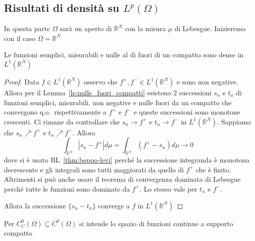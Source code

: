 \subsection{Risultati di densità su \(L^{p}{(\Omega)}\) }
In questa parte \(\Omega\) sarà un aperto di \(\mathbb{R}^{N}\) con la misura
\(\mu\) di Lebesgue. Inizieremo con il caso \(\Omega = \mathbb{R}^{N}\) 
\begin{proposition}\label{prop:risultato_1}
    Le funzioni semplici, misurabili e nulle al di fuori di un compatto sono
    dense in \(L^1(\mathbb{R}^{N})\) 
\end{proposition}
\begin{proof}
    Data \(f \in L^1(\mathbb{R}^{N})\) osservo che \(f^{+}, f^{-} \in
    L^1(\mathbb{R}^{N})\) e sono non negative. Allora per il
    Lemma~\ref{le:nulle_fuori_compatti} esistono 2 successioni
    \(s_{n}\) e \(t_{n}\) di funzioni semplici, misurabili, non negative e nulle fuori da un
    compatto che convergono q.o.~rispettivamente a \(f^{+}\) e \(f^{-}\) e
    queste successioni sono monotone crescenti. Ci rimane da controllare che
    \(s_{n} \to f^{+}\) e \(t_{n} \to f^{-}\) in \(L^{1}{(\mathbb{R}^{N})}\).
    Sappiamo che \(s_{n} \nearrow f^{+}\) e \(t_{n} \nearrow f^{-}\). Allora
    \[
        \int_{\mathbb{R}^{N}} |s_{n} - f^{+}| d\mu = \int_{\mathbb{R}^{N}}
        \left(f^{+}
        - s_{n}\right) d\mu \to 0
    \]
    dove si è usato BL~\ref{thm:beppo-levi} perché la successione integranda è
    monotona decrescente e gli integrali sono tutti maggiorati da quello di
    \(f^{+}\) che è finito. Altrimenti si può anche usare il teorema di
    convergenza dominata di Lebesgue perché tutte le funzioni sono dominate da
    \(f^{+}\). Lo stesso vale per \(t_{n}\) e \(f^{-}\). 

    Allora la successione \(\{s_{n} - t_{n}\}\) converge a \(f\) in
    \(L^1(\mathbb{R}^{N})\) 
\end{proof}

Per \(C_C^{0}{(\Omega)} \subseteq C^{0}{(\Omega)} \) si intende lo spazio di funzioni continue a supporto
compatto

